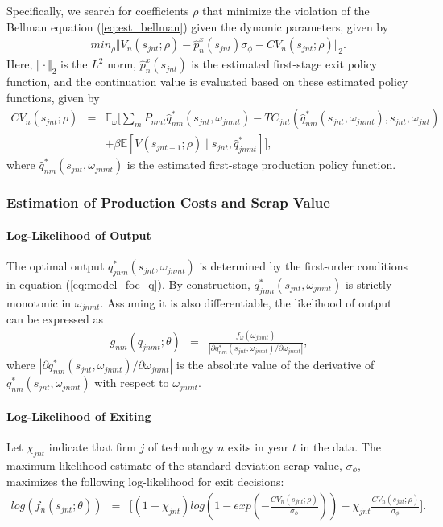 \documentclass[12pt, letter]{article}
\begin{document}
Specifically, we search for coefficients $\rho$ that minimize the violation of the Bellman equation (\ref{eq:est_bellman}) given the dynamic parameters, given by
\begin{eqnarray}
     &  & min_{\rho} \Vert V_n(s_{jnt};\rho) -\hat{p}^x_n(s_{jnt}) \sigma_{\phi} - CV_n(s_{jnt};\rho)\Vert_2.\label{eq:est_value_func_approx}
\end{eqnarray}
Here, $\Vert \cdot \Vert_2$ is the $L^2$ norm, $\hat{p}^x_n(s_{jnt})$ is the estimated first-stage exit policy function, and the continuation value is evaluated based on these estimated policy functions, given by
\begin{eqnarray*}
CV_n(s_{jnt};\rho) & = & \mathbb{E}_{\omega} \Big[ \sum_m P_{nmt} \hat{q}^*_{nm}(s_{jnt},\omega_{jnmt}) - TC_{jnt}(\hat{q}^*_{nm}(s_{jnt},\omega_{jnmt}),s_{jnt},\omega_{jnt}) \\
&& + \beta \mathbb{E}[V(s_{jnt+1};\rho)\mid s_{jnt}, \hat{q}^*_{jnmt}] \Big],
\end{eqnarray*}
where $\hat{q}^*_{nm}(s_{jnt},\omega_{jnmt})$ is the estimated first-stage production policy function.

\subsubsection{Estimation of Production Costs and Scrap Value}

\paragraph{Log-Likelihood of Output}
The optimal output $q^*_{jnm}(s_{jnt},\omega_{jnmt})$ is determined by the first-order conditions in equation (\ref{eq:model_foc_q}). By construction, $q^*_{jnm}(s_{jnt},\omega_{jnmt})$ is strictly monotonic in $\omega_{jnmt}$. Assuming it is also differentiable,  the likelihood of output can be expressed as
\begin{eqnarray}
    g_{nm}(q_{jnmt};\theta) &=& \frac{f_\omega(\omega_{jnmt})}{|\partial q_{nm}^*(s_{jnt},\omega_{jnmt}) /\partial \omega_{jnmt}|},\label{eq:est_log_likelihood_output}
\end{eqnarray}
where $|\partial q_{nm}^*(s_{jnt},\omega_{jnmt}) /\partial \omega_{jnmt}|$ is the absolute value of the derivative of $q_{nm}^*(s_{jnt},\omega_{jnmt})$ with respect to $\omega_{jnmt}$.

\paragraph{Log-Likelihood of Exiting}
Let $\chi_{jnt}$ indicate that firm $j$ of technology $n$ exits in year $t$ in the data. The maximum likelihood estimate of the standard deviation scrap value, $\sigma_\phi$, maximizes the following log-likelihood for exit decisions:
\begin{eqnarray}
    log(f_n(s_{jnt};\theta)) &=& \Big[ (1-\chi_{jnt}) log(1-exp(-\frac{CV_n(s_{jnt};\rho)}{\sigma_\phi})) - \chi_{jnt} \frac{CV_n(s_{jnt};\rho)}{\sigma_\phi} \Big]. \label{eq:est_log_likelihood_exit}   
\end{eqnarray}
\end{document}
